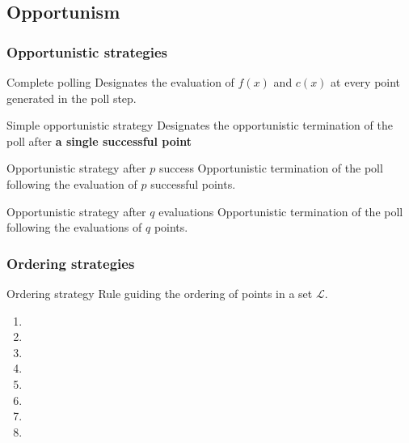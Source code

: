\documentclass[11pt,utf8,compress]{beamer}
\def\L{{\mathcal{L}}}
\begin{document}
\subsection{Opportunism}
\begin{frame}
\frametitle{Opportunistic strategies}
{\begin{block}{Complete polling}\small
		Designates the evaluation of $f(x)$ and $c(x)$ at every point generated in the poll step.
\end{block}}
\pause
\medskip
\begin{block}{Simple opportunistic strategy}\small
	Designates the opportunistic termination of the poll after \textbf{a single successful point} 
\end{block}
\pause
\medskip
\begin{block}{Opportunistic strategy after $p$ success}\small
	Opportunistic termination of the poll following the evaluation of \textbf{$p$} successful points.
\end{block}
\pause
\medskip
{\begin{block}{Opportunistic strategy after $q$ evaluations}\small
	Opportunistic termination of the poll following the evaluations of \textbf{$q$} points.\end{block}}
\end{frame}
\begin{frame}
\frametitle{Ordering strategies}
\begin{block}{Ordering strategy}
		Rule guiding the ordering of points in a set $\L$.
\end{block}
\begin{enumerate}
\item{}
\pause
\item[]
\pause
\item{}
\pause
\item{}
\pause
\item[]
\pause
\item{}
\pause
\item[]
\item[]
\end{enumerate}
\end{frame}
\end{document}
